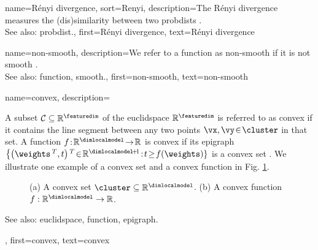 {name={R\'enyi divergence}, 
sort={Renyi},
	description={The R\'enyi divergence measures the (dis)similarity 
		between two \glspl{probdist} \cite{RenyiInfo95}.
				\\
		See also: \gls{probdist}.}, 
	first={R\'enyi divergence}, 
	text={R\'enyi divergence}
} 

{name={non-smooth},
	description={We refer to a \gls{function} as non-smooth if it is not 
		\gls{smooth} \cite{nesterov04}.
				\\
		See also: \gls{function}, \gls{smooth}.},
	first={non-smooth},
	text={non-smooth}
}

{name={convex},
	description={A subset $\mathcal{C} \subseteq \mathbb{R}^{\featuredim}$ of the 
		\gls{euclidspace} $\mathbb{R}^{\featuredim}$ is referred to as convex if it contains 
		the line segment between any two points $\vx, \vy\!\in\!\cluster$ in that set. A \gls{function}  
		$f\!:\!\mathbb{R}^{\dimlocalmodel}\!\rightarrow\!\mathbb{R}$ 
		is convex if its \gls{epigraph} $\big\{ \big( \weights\,^{T},t \big)\,^{T}\!\in\!\mathbb{R}^{\dimlocalmodel\!+\!1}\!:\!t\!\geq\!f(\weights) \}$ 
		is a convex set \cite{BoydConvexBook}. We illustrate one example of a convex set 
		and a convex \gls{function} in Fig. \ref{fig_convex_set_function_dict}. 
		\begin{figure}[H]
		\begin{center}
			\vspace*{-8mm}
			\end{center}
			\caption{(a) A convex set $\cluster \subseteq \mathbb{R}^{\dimlocalmodel}$. 
				(b) A convex \gls{function} $f: \mathbb{R}^{\dimlocalmodel} \rightarrow \mathbb{R}$.\label{fig_convex_set_function_dict}}
		\end{figure}
		See also: \gls{euclidspace}, \gls{function}, \gls{epigraph}.},
	first={convex},
	text={convex}
}


